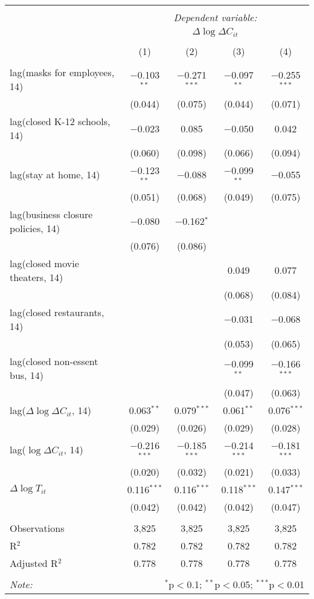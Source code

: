 \begin{tabular}{@{\extracolsep{1pt}}lcccc} 
\\[-1.8ex]\hline 
\hline \\[-1.8ex] 
 & \multicolumn{4}{c}{\textit{Dependent variable:}} \\ 
\cline{2-5} 
 & \multicolumn{4}{c}{$\Delta \log \Delta C_{it}$} \\ 
\\[-1.8ex] & (1) & (2) & (3) & (4)\\ 
\hline \\[-1.8ex] 
 lag(masks for employees, 14) & $-$0.103$^{**}$ & $-$0.271$^{***}$ & $-$0.097$^{**}$ & $-$0.255$^{***}$ \\ 
  & (0.044) & (0.075) & (0.044) & (0.071) \\ 
  lag(closed K-12 schools, 14) & $-$0.023 & 0.085 & $-$0.050 & 0.042 \\ 
  & (0.060) & (0.098) & (0.066) & (0.094) \\ 
  lag(stay at home, 14) & $-$0.123$^{**}$ & $-$0.088 & $-$0.099$^{**}$ & $-$0.055 \\ 
  & (0.051) & (0.068) & (0.049) & (0.075) \\ 
  lag(business closure policies, 14) & $-$0.080 & $-$0.162$^{*}$ &  &  \\ 
  & (0.076) & (0.086) &  &  \\ 
  lag(closed movie theaters, 14) &  &  & 0.049 & 0.077 \\ 
  &  &  & (0.068) & (0.084) \\ 
  lag(closed restaurants, 14) &  &  & $-$0.031 & $-$0.068 \\ 
  &  &  & (0.053) & (0.065) \\ 
  lag(closed non-essent bus, 14) &  &  & $-$0.099$^{**}$ & $-$0.166$^{***}$ \\ 
  &  &  & (0.047) & (0.063) \\ 
  lag($\Delta \log \Delta C_{it}$, 14) & 0.063$^{**}$ & 0.079$^{***}$ & 0.061$^{**}$ & 0.076$^{***}$ \\ 
  & (0.029) & (0.026) & (0.029) & (0.028) \\ 
  lag($\log \Delta C_{it}$, 14) & $-$0.216$^{***}$ & $-$0.185$^{***}$ & $-$0.214$^{***}$ & $-$0.181$^{***}$ \\ 
  & (0.020) & (0.032) & (0.021) & (0.033) \\ 
  $\Delta \log T_{it}$ & 0.116$^{***}$ & 0.116$^{***}$ & 0.118$^{***}$ & 0.147$^{***}$ \\ 
  & (0.042) & (0.042) & (0.042) & (0.047) \\ 
 \hline \\[-1.8ex] 
Observations & 3,825 & 3,825 & 3,825 & 3,825 \\ 
R$^{2}$ & 0.782 & 0.782 & 0.782 & 0.782 \\ 
Adjusted R$^{2}$ & 0.778 & 0.778 & 0.778 & 0.778 \\ 
\hline 
\hline \\[-1.8ex] 
\textit{Note:}  & \multicolumn{4}{r}{$^{*}$p$<$0.1; $^{**}$p$<$0.05; $^{***}$p$<$0.01} \\ 
\end{tabular} 